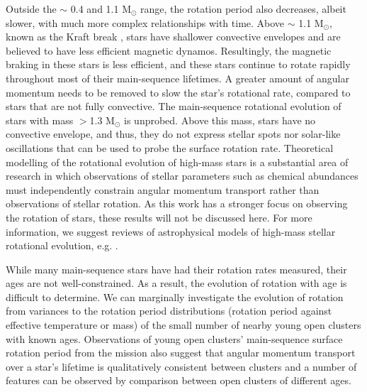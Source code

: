 Outside the $\sim$ 0.4 and 1.1 M$_{\odot}$ range, the rotation period also decreases, albeit slower, with much more complex relationships with time.
Above $\sim$ 1.1 M$_{\odot}$, known as the Kraft break \citep{kraft_studies_1967}, stars have shallower convective envelopes and are believed to have less efficient magnetic dynamos.
Resultingly, the magnetic braking in these stars is less efficient, and these stars continue to rotate rapidly throughout most of their main-sequence lifetimes. 
A greater amount of angular momentum needs to be removed to slow the star's rotational rate, compared to stars that are not fully convective.
The main-sequence rotational evolution of stars with mass $>$1.3 M$_{\odot}$ is unprobed.
Above this mass, stars have no convective envelope, and thus, they do not express stellar spots nor solar-like oscillations that can be used to probe the surface rotation rate.
Theoretical modelling of the rotational evolution of high-mass stars is a substantial area of research in which observations of stellar parameters such as chemical abundances must independently constrain angular momentum transport rather than observations of stellar rotation.
As this work has a stronger focus on observing the rotation of stars, these results will not be discussed here.
For more information, we suggest reviews of astrophysical models of high-mass stellar rotational evolution, e.g. \citet{heger_presupernova_1998,maeder_evolution_2000,maeder_physics_2009}.

While many main-sequence stars have had their rotation rates measured, their ages are not well-constrained.
As a result, the evolution of rotation with age is difficult to determine.
We can marginally investigate the evolution of rotation from variances to the rotation period distributions (rotation period against effective temperature or mass) of the small number of nearby young open clusters with known ages.
Observations of young open clusters' main-sequence surface rotation period from the \kepler{} mission also suggest that angular momentum transport over a star's lifetime is qualitatively consistent between clusters \citep{spada_competing_2020} and a number of features can be observed by comparison between open clusters of different ages.

